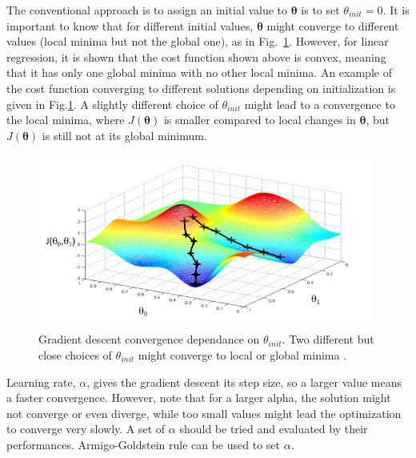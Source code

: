 The conventional approach is to assign an initial value to ${\bm{\theta}}$ is to set $\theta_{init} = 0$.
It is important to know that for different initial values, ${\bm{\theta}}$ might converge to different values (local minima but not the global one), as in Fig.~\ref{fig:localOrGlobalMinimaGD}. 
However, for linear regression, it is shown that the cost function shown above is convex, meaning that it has only one global minima with no other local minima. An example of the cost function converging to different solutions depending on initialization is given in Fig.\ref{fig:localOrGlobalMinimaGD}. A slightly different choice of $\theta_{init}$ might lead to a convergence to the local minima, where $J(\bm{\theta})$ is smaller compared to local changes in $\bm{\theta}$, but $J(\bm{\theta})$ is still not at its global minimum.

\begin{figure}
\begin{center}
\includegraphics[width=11cm]{figures/localOrGlobalMinimaGD}    %
\caption{Gradient descent convergence dependance on $\theta_{init}$. Two different but close choices of $\theta_{init}$ might converge to local or global minima \cite{andrewNg_MachLearning}.} 
\label{fig:localOrGlobalMinimaGD}
\end{center}
\end{figure}
 
Learning rate,  $\alpha$, gives the gradient descent its step size, so a larger value means a faster convergence. 
However, note that for a larger alpha, the solution might not converge or even diverge, while too small values might lead the optimization to converge very slowly.
A set of $\alpha$ should be tried and evaluated by their performances. 
 Armigo-Goldstein rule can be used to set $\alpha$. 

